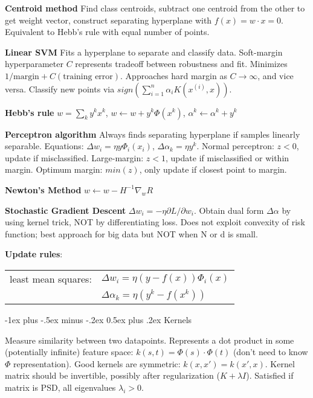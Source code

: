 \documentclass[9pt,landscape]{extarticle}
\makeatletter
\renewcommand{\section}{\@startsection{section}{1}{0mm}%
                                {-1ex plus -.5ex minus -.2ex}%
                                {0.5ex plus .2ex}%
                                {\normalfont\normalsize\bfseries}}
\newcommand{\idx}[1]{^{(#1)}}
\makeatother
\begin{document}
\begin{multicols}{3}
\textbf{Centroid method} Find class centroids, subtract one centroid from the other to get weight vector, construct separating hyperplane with $f(x) = w \cdot x = 0$. Equivalent to Hebb's rule with equal number of points.

\textbf{Linear SVM} Fits a hyperplane to separate and classify data. Soft-margin hyperparameter $C$ represents tradeoff between robustness and fit. Minimizes $1/\text{margin} + C(\text{training error})$. Approaches hard margin as $C\rightarrow\infty$, and vice versa. Classify new points via $sign(\sum_{i=1}^{n}\alpha_i K(x\idx{i}, x))$.

\textbf{Hebb's rule} $w = \sum_k y^k x^k$, $w \leftarrow w + y^k \Phi(x^k)$, $\alpha^k \leftarrow \alpha^k + y^k$

\textbf{Perceptron algorithm} Always finds separating hyperplane if samples linearly separable. Equations: $\Delta w_i = \eta y \Phi_i(x_i)$, $\Delta \alpha_k = \eta y^k$. Normal perceptron: $z < 0$, update if misclassified. Large-margin: $z < 1$, update if misclassified or within margin. Optimum margin: $min(z)$, only update if closest point to margin.


\textbf{Newton's Method} $w \leftarrow w - H^{-1}\nabla_w R$

\textbf{Stochastic Gradient Descent} $\Delta w_i = -\eta \partial L / \partial w_i$. Obtain dual form $\Delta \alpha$ by using kernel trick, NOT by differentiating loss. Does not exploit convexity of risk function; best approach for big data but NOT when N or d is small.

\textbf{Update rules}:

\begin{tabular}{@{}ll@{}}
least mean squares:         & $\Delta w_i = \eta (y - f(x)) \Phi_i (x)$ \\
                            & $\Delta \alpha_k = \eta (y^k - f(x^k))$
\end{tabular}


\section{Kernels}

Measure similarity between two datapoints. Represents a dot product in some (potentially infinite) feature space: $k(s, t) = \Phi(s) \cdot \Phi(t)$ (don't need to know $\Phi$ representation). Good kernels are symmetric: $k(x, x') = k(x', x)$. Kernel matrix should be invertible, possibly after regularization ($K+\lambda I$). Satisfied if matrix is PSD, all eigenvalues $\lambda_i > 0$.


\end{multicols}
\end{document}
